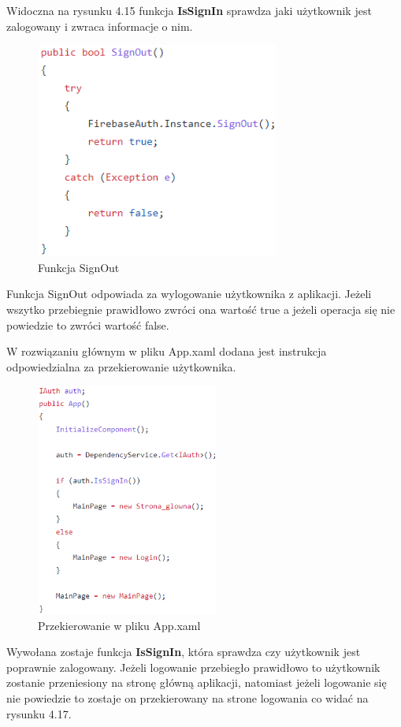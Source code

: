 Widoczna na rysunku 4.15 funkcja \textbf{IsSignIn} sprawdza jaki użytkownik jest zalogowany i zwraca informacje o nim.

\begin{figure}[!htb]
	\begin{center}
		\includegraphics[width=8cm]{rys/authdroid4.png}
		\caption{Funkcja SignOut}
		\label{rys:rysunek027}
	\end{center}
\end{figure}       

Funkcja SignOut odpowiada za wylogowanie użytkownika z aplikacji. Jeżeli wszytko przebiegnie prawidłowo zwróci ona wartość true a jeżeli operacja się nie powiedzie to zwróci wartość false. \newline \newline 

W rozwiązaniu głównym w pliku App.xaml dodana jest instrukcja odpowiedzialna za przekierowanie użytkownika. \newline \newline

\begin{figure}[!htb]
	\begin{center}
		\includegraphics[width=6cm]{rys/firebase_app_xaml.png}
		\caption{Przekierowanie w pliku App.xaml}
		\label{rys:rysunek028}
	\end{center}
\end{figure}

Wywołana zostaje funkcja \textbf{IsSignIn}, która sprawdza czy użytkownik jest poprawnie zalogowany. Jeżeli logowanie przebiegło prawidłowo to użytkownik zostanie przeniesiony na stronę główną aplikacji, natomiast jeżeli logowanie się nie powiedzie to zostaje on przekierowany na strone logowania co widać na rysunku 4.17.   
